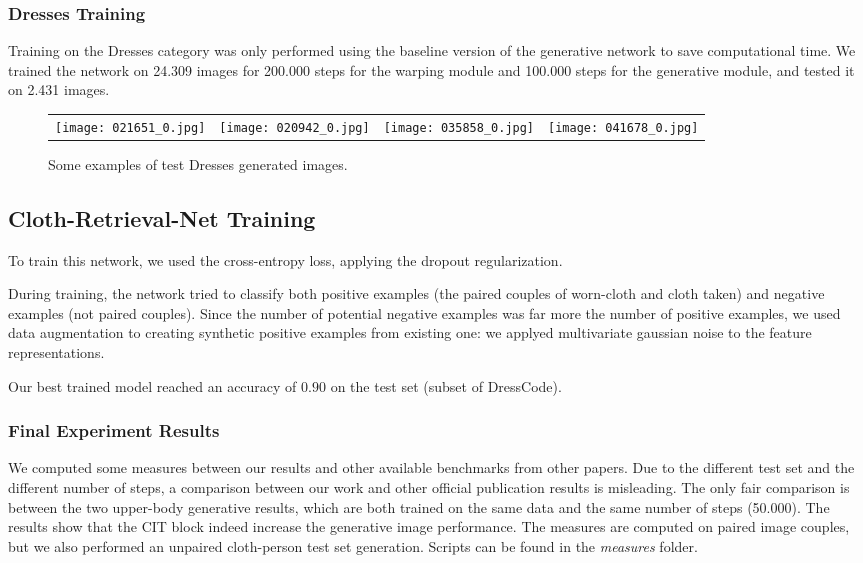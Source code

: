 \subsubsection{Dresses Training}

Training on the Dresses category was only performed using the baseline version of the generative network to save computational time. We trained the network on 24.309 images for 200.000 steps for the warping module and 100.000 steps for the generative module, and tested it on 2.431 images.


\begin{figure}[h]
\centering
\begin{tabular}{cccc}
{\texttt{[image: 021651\_0.jpg]}} &
{\texttt{[image: 020942\_0.jpg]}} &
{\texttt{[image: 035858\_0.jpg]}} &
{\texttt{[image: 041678\_0.jpg]}} \\
\end{tabular}

\caption{Some examples of test Dresses generated images.}
\end{figure}

\subsection{Cloth-Retrieval-Net Training}
To train this network, we used the cross-entropy loss, applying the dropout regularization.

During training, the network tried to classify both positive examples (the paired couples of worn-cloth and cloth taken) and negative examples (not paired couples). Since the number of potential negative examples was far more the number of positive examples, we used data augmentation to creating synthetic positive examples from existing one: we applyed multivariate gaussian noise to the feature representations.

Our best trained model reached an accuracy of $0.90$ on the test set (subset of DressCode).  


\subsubsection{Final Experiment Results}
We computed some measures between our results and other available benchmarks from other papers. Due to the different test set and the different number of steps, a comparison between our work and other official publication results is misleading. The only fair comparison is between the two upper-body generative results, which are both trained on the same data and the same number of steps (50.000). The results show that the CIT block indeed increase the generative image performance. The measures are computed on paired image couples, but we also performed an unpaired cloth-person test set generation. Scripts can be found in the \textit{measures} folder.

